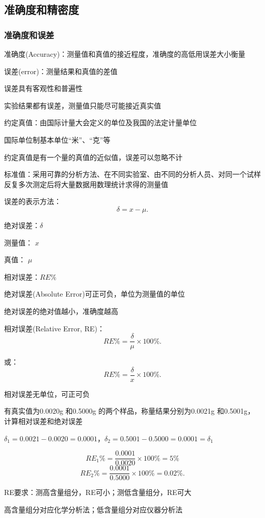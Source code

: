 \subsection{准确度和精密度}%
\label{sub:准确度和精密度}
\subsubsection{准确度和误差}%
\label{subsub:准确度和误差}
\begin{defi}
    准确度(Accuracy)：测量值和真值的接近程度，准确度的高低用误差大小衡量
\end{defi}
\begin{defi}
    误差(error)：测量结果和真值的差值
\end{defi}
误差具有客观性和普遍性

实验结果都有误差，测量值只能尽可能接近真实值
\begin{defi}
    约定真值：由国际计量大会定义的单位及我国的法定计量单位
    \begin{eg}
        国际单位制基本单位“米”、“克”等
    \end{eg}
    \begin{notation}
        约定真值是有一个量的真值的近似值，误差可以忽略不计
    \end{notation}
\end{defi}

\begin{defi}
    标准值：采用可靠的分析方法、在不同实验室、由不同的分析人员、对同一个试样反复多次测定后将大量数据用数理统计求得的测量值
\end{defi}
误差的表示方法：\[
    \delta=x-\mu
.\] 
\begin{defi}
    绝对误差：$\delta$

    测量值： $x$

    真值： $\mu$ 

    相对误差：$RE\%$
\end{defi}
绝对误差(Absolute Error)可正可负，单位为测量值的单位

绝对误差的绝对值越小，准确度越高

相对误差(Relative Error, RE)：\[
    RE\% = \frac{\delta}{\mu}\times 100\%
.\] 

或：\[
    RE\% = \frac{\delta}{x}\times 100\%
.\]

相对误差无单位，可正可负
\begin{eg}
    有真实值为0.0020g 和0.5000g 的两个样品，称量结果分别为0.0021g 和0.5001g，计算相对误差和绝对误差

$\delta_1=0.0021-0.0020=0.0001$，$\delta_2=0.5001-0.5000=0.0001=\delta_1$

\[
    RE_1\%=\frac{0.0001}{0.0020}\times 100\%=5\%
\]
\[
    RE_2\%=\frac{0.0001}{0.5000}\times 100\%=0.02\%
.\]  
\end{eg}
\begin{notation}
    RE要求：测高含量组分，RE可小；测低含量组分，RE可大

    高含量组分对应化学分析法；低含量组分对应仪器分析法
\end{notation}
